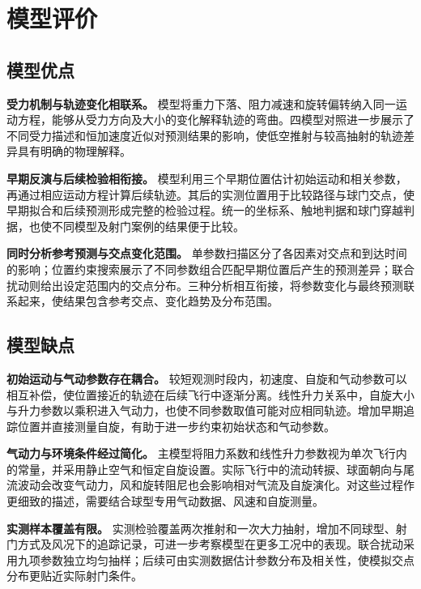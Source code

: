\documentclass[12pt,letterpaper]{article}
\begin{document}
\section{模型评价}

\subsection{模型优点}

\noindent\hspace*{\parindent}\textbf{受力机制与轨迹变化相联系。} 模型将重力下落、阻力减速和旋转偏转纳入同一运动方程，能够从受力方向及大小的变化解释轨迹的弯曲。四模型对照进一步展示了不同受力描述和恒加速度近似对预测结果的影响，使低空推射与较高抽射的轨迹差异具有明确的物理解释。

\textbf{早期反演与后续检验相衔接。} 模型利用三个早期位置估计初始运动和相关参数，再通过相应运动方程计算后续轨迹。其后的实测位置用于比较路径与球门交点，使早期拟合和后续预测形成完整的检验过程。统一的坐标系、触地判据和球门穿越判据，也使不同模型及射门案例的结果便于比较。

\textbf{同时分析参考预测与交点变化范围。} 单参数扫描区分了各因素对交点和到达时间的影响；位置约束搜索展示了不同参数组合匹配早期位置后产生的预测差异；联合扰动则给出设定范围内的交点分布。三种分析相互衔接，将参数变化与最终预测联系起来，使结果包含参考交点、变化趋势及分布范围。

\subsection{模型缺点}

\noindent\hspace*{\parindent}\textbf{初始运动与气动参数存在耦合。} 较短观测时段内，初速度、自旋和气动参数可以相互补偿，使位置接近的轨迹在后续飞行中逐渐分离。线性升力关系中，自旋大小与升力参数以乘积进入气动力，也使不同参数取值可能对应相同轨迹。增加早期追踪位置并直接测量自旋，有助于进一步约束初始状态和气动参数。

\textbf{气动力与环境条件经过简化。} 主模型将阻力系数和线性升力参数视为单次飞行内的常量，并采用静止空气和恒定自旋设置。实际飞行中的流动转捩、球面朝向与尾流波动会改变气动力，风和旋转阻尼也会影响相对气流及自旋演化。对这些过程作更细致的描述，需要结合球型专用气动数据、风速和自旋测量。

\textbf{实测样本覆盖有限。} 实测检验覆盖两次推射和一次大力抽射，增加不同球型、射门方式及风况下的追踪记录，可进一步考察模型在更多工况中的表现。联合扰动采用九项参数独立均匀抽样；后续可由实测数据估计参数分布及相关性，使模拟交点分布更贴近实际射门条件。
\end{document}

